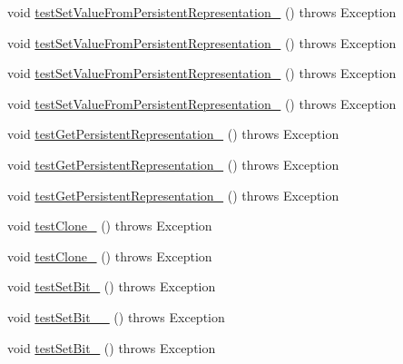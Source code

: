 \begin{DoxyCompactItemize}
\item 
void \hyperlink{classorg_1_1jgap_1_1impl_1_1_fixed_binary_gene_test_a3ccac3711d6b172c19275a4ab139ffcb}{test\-Set\-Value\-From\-Persistent\-Representation\-\_} ()  throws Exception 
\item 
void \hyperlink{classorg_1_1jgap_1_1impl_1_1_fixed_binary_gene_test_a6e94418b4aa9a7116a00849d2a84f15b}{test\-Set\-Value\-From\-Persistent\-Representation\-\_} ()  throws Exception 
\item 
void \hyperlink{classorg_1_1jgap_1_1impl_1_1_fixed_binary_gene_test_aadc16bfa10898ebe6327517442704ed8}{test\-Set\-Value\-From\-Persistent\-Representation\-\_} ()  throws Exception 
\item 
void \hyperlink{classorg_1_1jgap_1_1impl_1_1_fixed_binary_gene_test_abe87a48301931e7cc838d0c3e62d1a28}{test\-Set\-Value\-From\-Persistent\-Representation\-\_} ()  throws Exception 
\item 
void \hyperlink{classorg_1_1jgap_1_1impl_1_1_fixed_binary_gene_test_a5edfdef57699a415de4a6183aa4f8c14}{test\-Get\-Persistent\-Representation\-\_} ()  throws Exception 
\item 
void \hyperlink{classorg_1_1jgap_1_1impl_1_1_fixed_binary_gene_test_a588a3a38b087ad62ec7a31cb9ae57dec}{test\-Get\-Persistent\-Representation\-\_} ()  throws Exception 
\item 
void \hyperlink{classorg_1_1jgap_1_1impl_1_1_fixed_binary_gene_test_a02700791a92267646dabcf448b5c4f62}{test\-Get\-Persistent\-Representation\-\_} ()  throws Exception 
\item 
void \hyperlink{classorg_1_1jgap_1_1impl_1_1_fixed_binary_gene_test_ad4e529467a652e1025c9510fe364ae2d}{test\-Clone\-\_} ()  throws Exception 
\item 
void \hyperlink{classorg_1_1jgap_1_1impl_1_1_fixed_binary_gene_test_a46521596c4e48b3ec95e2a6b158aeb8d}{test\-Clone\-\_} ()  throws Exception 
\item 
void \hyperlink{classorg_1_1jgap_1_1impl_1_1_fixed_binary_gene_test_ac0e86b64d57dc98eded02b61e3cb3e53}{test\-Set\-Bit\-\_} ()  throws Exception 
\item 
void \hyperlink{classorg_1_1jgap_1_1impl_1_1_fixed_binary_gene_test_a50e34cbb309f67b8d36b92bb0ea454a8}{test\-Set\-Bit\-\_\-\_} ()  throws Exception 
\item 
void \hyperlink{classorg_1_1jgap_1_1impl_1_1_fixed_binary_gene_test_a01af2a9049c16576dcb3af29c3a6c9c1}{test\-Set\-Bit\-\_} ()  throws Exception 
\item 

\end{DoxyCompactItemize}
